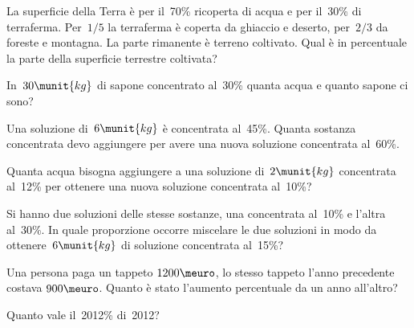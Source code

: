\begin{htmulticols}{2}
\begin{esercizio}
 \label{ese:3.107}
La superficie della Terra è per il~70\% ricoperta di acqua e per il~30\% 
di terraferma.
Per~\(1/5\) la terraferma è coperta da ghiaccio e deserto, per~\(2/3\) da 
foreste e montagna.
La parte rimanente è terreno coltivato. Qual è in percentuale la parte 
della superficie terrestre coltivata?
\end{esercizio}

\begin{esercizio}[*]
 \label{ese:3.108}
In~\(30\munit{kg}\) di sapone concentrato al~30\% quanta acqua e quanto 
sapone ci sono? 
\end{esercizio}

\begin{esercizio}
 \label{ese:3.109}
Una soluzione di~\(6\munit{kg}\) è concentrata al~45\%. Quanta sostanza 
concentrata devo aggiungere per avere una nuova soluzione concentrata al~60\%.
\end{esercizio}

\begin{esercizio}
 \label{ese:3.110}
Quanta acqua bisogna aggiungere a una soluzione di~\(2\munit{kg}\)
concentrata al~12\% per ottenere una nuova soluzione concentrata al~10\%?
\end{esercizio}

\begin{esercizio}
 \label{ese:3.111}
Si hanno due soluzioni delle stesse sostanze, una concentrata al~10\% e 
l'altra al~30\%.
In quale proporzione occorre miscelare le due soluzioni in modo da 
ottenere~\(6\munit{kg}\) di soluzione concentrata al~15\%?
\end{esercizio}


\begin{esercizio}
 \label{ese:3.113}
Una persona paga un tappeto \(1200\meuro\), lo stesso tappeto 
l'anno precedente costava \(900\meuro\).
Quanto è stato l'aumento percentuale da un anno all'altro?
\end{esercizio}

\begin{esercizio}
 \label{ese:3.114}
Quanto vale il~2012\% di~2012?
\end{esercizio}
\end{htmulticols}

